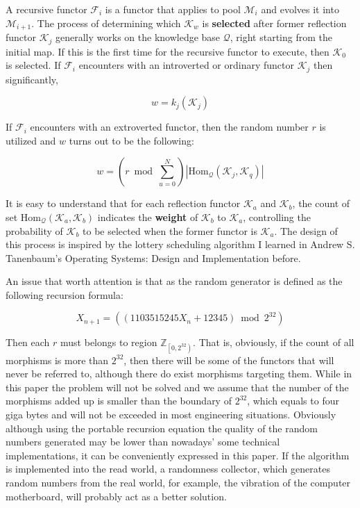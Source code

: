 \documentclass[preprint]{elsarticle}
\numberwithin{theorem}{section}	%
\numberwithin{axiom}{section}	%
\numberwithin{definition}{section}	%
\begin{document}
\begin{definition}
	A recursive functor \(\mathcal{F}_i\) is a functor that applies to pool \(\mathcal{M}_i\) and evolves it into \(\mathcal{M}_{i+1}\). The process of determining which \(\mathcal{K}_w\) is \textbf{ selected} after former reflection functor \(\mathcal{K}_j\) generally works on the knowledge base \(\mathcal{Q}\), right starting from the initial map. If this is the first time for the recursive functor to execute, then \(\mathcal{K}_0\) is selected. If \(\mathcal{F}_i\) encounters with an introverted or ordinary functor \(\mathcal{K}_j\) then significantly,
	
	\begin{equation}
		w = k_j\left(\mathcal{K}_j\right)
	\end{equation}
	
	If \(\mathcal{F}_i\) encounters with an extroverted functor, then the random number \(\mathit{r}\) is utilized and \(w\) turns out to be the following:
	
	\begin{equation}
		w = (\mathit{r} \bmod \sum _{u=0}^N )\left|\text{Hom}_{\mathcal{Q}}\left(\mathcal{K}_j,\mathcal{K}_q\right)\right|
	\end{equation}
	
	It is easy to understand that for each reflection functor \(\mathcal{K}_a\) and \(\mathcal{K}_b\), the count of set \(\text{Hom}_{\mathcal{Q}}\left(\mathcal{K}_a,\mathcal{K}_b\right)\) indicates the \textbf{ weight} of \(\mathcal{K}_b\) to \(\mathcal{K}_a\), controlling the probability of \(\mathcal{K}_b\) to be selected when the former functor is \(\mathcal{K}_a\). The design of this process is inspired by the lottery scheduling algorithm I learned in Andrew S. Tanenbaum{'}s Operating Systems: Design and Implementation \cite{Tanenbaum2015} before.
\end{definition}

An issue that worth attention is that as the random generator is defined as the following recursion formula: \cite{Entacher1997}

\begin{equation*}
	X_{n+1}=(\left(1103515245 X_n+12345\right) \bmod 2^{32})
\end{equation*}

Then each \(\mathit{r}\) must belongs to region \(\mathbb{Z}_{\left.\left[0,2^{32}\right.\right)}\). That is, obviously, if the count of all morphisms is more than $2^32$, then there will be some of the functors that will never be referred to, although there do exist morphisms targeting them. While in this paper the problem will not be solved and we assume that the number of the morphisms added up is smaller than the boundary of \(2^{32}\), which equals to four giga bytes and will not be exceeded in most engineering situations. Obviously although using the portable recursion equation the quality of the random numbers generated may be lower than nowadays{'} some technical implementations, it can be conveniently expressed in this paper. If the algorithm is implemented into the read world, a randomness collector, which generates random numbers from the real world, for example, the vibration of the computer motherboard, will probably act as a better solution.
\end{document}
